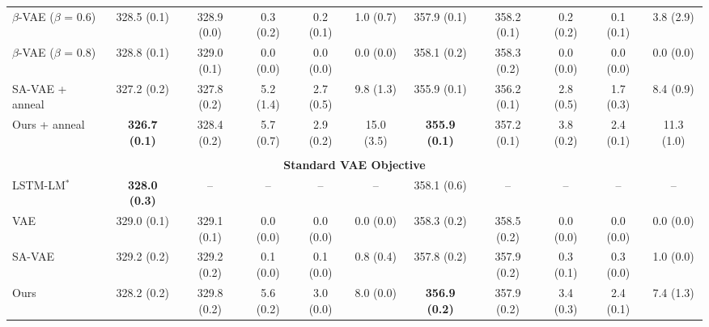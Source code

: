 \documentclass{article} \usepackage{iclr2019_conference,times}
\begin{document}
\begin{table}[h]
{\begin{tabular}{lccccc|ccccc}
    $\beta$-VAE ($\beta$ = 0.6) &328.5 (0.1)  &328.9 (0.0) &0.3 (0.2)   &0.2 (0.1)  &1.0 (0.7) &357.9 (0.1)  &358.2 (0.1) &0.2 (0.2)  &0.1 (0.1) & 3.8 (2.9)  \\
    $\beta$-VAE ($\beta$ = 0.8) &328.8 (0.1)   &329.0 (0.1) &0.0 (0.0)   &0.0 (0.0) &0.0 (0.0)  &358.1 (0.2)  &358.3 (0.2) &0.0 (0.0)  &0.0 (0.0) & 0.0 (0.0) \\
    SA-VAE + anneal          &327.2 (0.2) &327.8 (0.2) &5.2 (1.4)   &2.7 (0.5)   &9.8 (1.3) &355.9 (0.1)     &356.2 (0.1)       &2.8 (0.5)     &1.7 (0.3) & 8.4 (0.9) \\
    Ours + anneal               &\textbf{326.7 (0.1)}  &328.4 (0.2) &5.7 (0.7)   &2.9 (0.2)  &15.0 (3.5) &\textbf{355.9 (0.1)}  &357.2 (0.1) &3.8 (0.2)     &2.4 (0.1)  & 11.3 (1.0) \\
    \midrule
    \vspace{-9pt} \\
    \multicolumn{11}{c}{\bf Standard VAE Objective} \vspace{3pt} \\
    LSTM-LM$^\ast$              &\textbf{328.0 (0.3)}     &--            &--    &--   &-- &358.1 (0.6)    &--   &--      &--   &-- \\
    VAE                         &329.0 (0.1)   &329.1 (0.1) &0.0 (0.0)   &0.0 (0.0) &0.0 (0.0)   &358.3 (0.2)   &358.5 (0.2)  &0.0 (0.0)     &0.0 (0.0)   &0.0 (0.0)\\
    SA-VAE                      &329.2 (0.2) &329.2 (0.2)  &0.1 (0.0)   &0.1 (0.0) &0.8 (0.4)  &357.8 (0.2)  &357.9 (0.2)  &0.3 (0.1)     &0.3 (0.0) &1.0 (0.0) \\
    Ours                        &328.2 (0.2)   &329.8 (0.2)     &5.6 (0.2)   &3.0 (0.0) &8.0 (0.0)  &\textbf{356.9 (0.2)}  &357.9 (0.2) &3.4 (0.3)  &2.4 (0.1) &7.4 (1.3)  \\    
    \bottomrule
    \end{tabular}}
\end{table}
\end{document}
